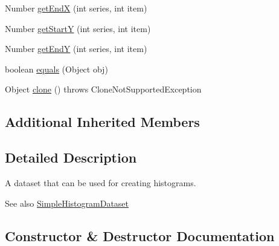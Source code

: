 \begin{DoxyCompactItemize}
\item 
Number \mbox{\hyperlink{classorg_1_1jfree_1_1data_1_1statistics_1_1_histogram_dataset_a573dd7321bd64f58b99f786bd3a9ad34}{get\+EndX}} (int series, int item)
\item 
Number \mbox{\hyperlink{classorg_1_1jfree_1_1data_1_1statistics_1_1_histogram_dataset_aa8bbdecb3157607d7522130d08cca440}{get\+StartY}} (int series, int item)
\item 
Number \mbox{\hyperlink{classorg_1_1jfree_1_1data_1_1statistics_1_1_histogram_dataset_a3bf9d22d1d5a7d47ca3746c706198afe}{get\+EndY}} (int series, int item)
\item 
boolean \mbox{\hyperlink{classorg_1_1jfree_1_1data_1_1statistics_1_1_histogram_dataset_a53af2148d6daa45923fb8d2e4e918ce4}{equals}} (Object obj)
\item 
Object \mbox{\hyperlink{classorg_1_1jfree_1_1data_1_1statistics_1_1_histogram_dataset_afc0e86937d0d1bfa610f96a6cdb5d518}{clone}} ()  throws Clone\+Not\+Supported\+Exception 
\end{DoxyCompactItemize}
\subsection*{Additional Inherited Members}


\subsection{Detailed Description}
A dataset that can be used for creating histograms.

\begin{DoxySeeAlso}{See also}
\mbox{\hyperlink{classorg_1_1jfree_1_1data_1_1statistics_1_1_simple_histogram_dataset}{Simple\+Histogram\+Dataset}} 
\end{DoxySeeAlso}


\subsection{Constructor \& Destructor Documentation}
\mbox{\label{classorg_1_1jfree_1_1data_1_1statistics_1_1_histogram_dataset_ac851bee8cb3847f1fd821444d9c713b9}} 
